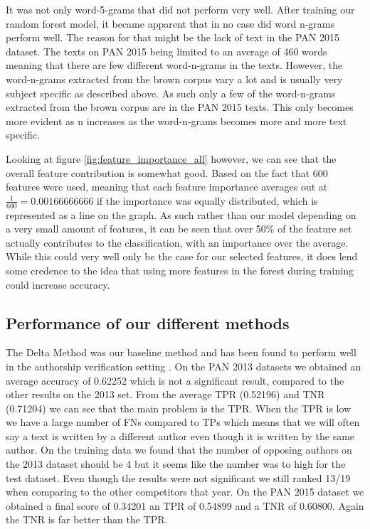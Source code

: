 It was not only word-5-grams that did not perform very well. After training our
random forest model, it became apparent that in no case did word n-grams perform
well. The reason for that might be the lack of text in the PAN 2015 dataset.
The texts on PAN 2015 being limited to an average of 460 words meaning that
there are few different word-n-grams in the texts. However, the word-n-grams
extracted from the brown corpus vary a lot and is usually very subject specific
as described above. As such only a few of the word-n-grams extracted from the
brown corpus are in the PAN 2015 texts. This only becomes more evident as n
increases as the word-n-grams becomes more and more text specific.

Looking at figure \ref{fig:feature_importance_all} however, we can see that
the overall feature contribution is somewhat good. Based on the fact that
600 features were used, meaning that each feature importance averages out at
$\frac{1}{600} = 0.00166666666$ if the importance was equally distributed, which
is represented as a line on the graph. As such rather than our model depending
on a very small amount of features, it can be seen that
over 50\% of the feature set actually contributes to the classification, with
an importance over the average. While this could very well only be the case for
our selected features, it does lend some credence to the idea that using more
features in the forest during training could increase accuracy.

\subsection{Performance of our different methods}

The Delta Method was our baseline method and has been found to perform well in
the authorship verification setting \cite{evert2015towards}. On the PAN 2013
datasets we obtained an average accuracy of 0.62252 which is not a significant
result, compared to the other results on the 2013 set. From the average
\gls{TPR} (0.52196) and \gls{TNR} (0.71204) we can see that the main problem is
the \gls{TPR}. When the \gls{TPR} is low we have a large number of \gls{FN}s
compared to \gls{TP}s which means that we will often say a text is written by a
different author even though it is written by the same author. On the training
data we found that the number of opposing authors on the 2013 dataset should be
4 but it seems like the number was to high for the test dataset. Even though the
results were not significant we still ranked 13/19 when comparing to the other
competitors that year. On the PAN 2015 dataset we obtained a final score of
0.34201 an \gls{TPR} of 0.54899 and a \gls{TNR} of 0.60800. Again the \gls{TNR}
is far better than the \gls{TPR}.

